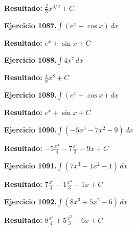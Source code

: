 \documentclass[10pt,a4paper]{article}
\begin{document}
\begin{solbox}
\textbf{Resultado:} \(\displaystyle \frac{2}{3}x^{3/2} + C\)
\end{solbox}

\newpage
\begin{ejbox}
\textbf{Ejercicio 1087.}\quad $\int (e^x + \cos x)\,dx$
\end{ejbox}

\begin{solbox}
\textbf{Resultado:} \(\displaystyle e^x + \sin x + C\)
\end{solbox}

\begin{ejbox}
\textbf{Ejercicio 1088.}\quad $\int 4x^{7}\,dx$
\end{ejbox}

\begin{solbox}
\textbf{Resultado:} \(\displaystyle \frac{4}{8}x^{8} + C\)
\end{solbox}

\begin{ejbox}
\textbf{Ejercicio 1089.}\quad $\int (e^x + \cos x)\,dx$
\end{ejbox}

\begin{solbox}
\textbf{Resultado:} \(\displaystyle e^x + \sin x + C\)
\end{solbox}

\newpage
\begin{ejbox}
\textbf{Ejercicio 1090.}\quad $\int (-5x^3 -7x^2 -9)\,dx$
\end{ejbox}

\begin{solbox}
\textbf{Resultado:} \(\displaystyle -5\frac{x^4}{4} -7\frac{x^3}{3} -9x + C\)
\end{solbox}

\begin{ejbox}
\textbf{Ejercicio 1091.}\quad $\int (7x^3 -1x^2 -1)\,dx$
\end{ejbox}

\begin{solbox}
\textbf{Resultado:} \(\displaystyle 7\frac{x^4}{4} -1\frac{x^3}{3} -1x + C\)
\end{solbox}

\begin{ejbox}
\textbf{Ejercicio 1092.}\quad $\int (8x^3 +5x^2 -6)\,dx$
\end{ejbox}

\begin{solbox}
\textbf{Resultado:} \(\displaystyle 8\frac{x^4}{4} +5\frac{x^3}{3} -6x + C\)
\end{solbox}
\end{document}
